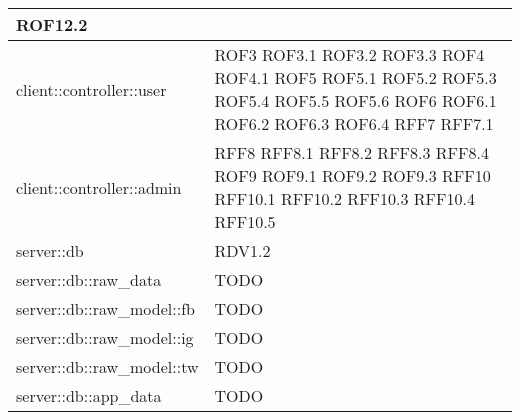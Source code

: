 \begin{center}
\begin{longtable}{| p{9cm} | p{4cm} |}
\newline ROF12.2 \\
\hline
client::controller::user  &  ROF3 \newline ROF3.1 \newline ROF3.2 \newline ROF3.3 \newline ROF4 
\newline ROF4.1 \newline ROF5 \newline ROF5.1 \newline ROF5.2 \newline ROF5.3 \newline ROF5.4
\newline ROF5.5  \newline ROF5.6 \newline ROF6 \newline ROF6.1 \newline ROF6.2 \newline ROF6.3 \newline ROF6.4 \newline RFF7 \newline RFF7.1 \\
\hline
client::controller::admin  &  RFF8 \newline RFF8.1 \newline RFF8.2 \newline RFF8.3 \newline RFF8.4
\newline ROF9 \newline ROF9.1 \newline ROF9.2 \newline ROF9.3 \newline RFF10 \newline RFF10.1
\newline RFF10.2 \newline RFF10.3 \newline RFF10.4 \newline RFF10.5 \\
\hline
server::db  & RDV1.2 \\
\hline
server::db::raw\_data  &  TODO \\
\hline
server::db::raw\_model::fb  & TODO \\
\hline
server::db::raw\_model::ig  & TODO \\
\hline
server::db::raw\_model::tw  & TODO \\
\hline
server::db::app\_data  &  TODO \\

\end{longtable}
\end{center}
